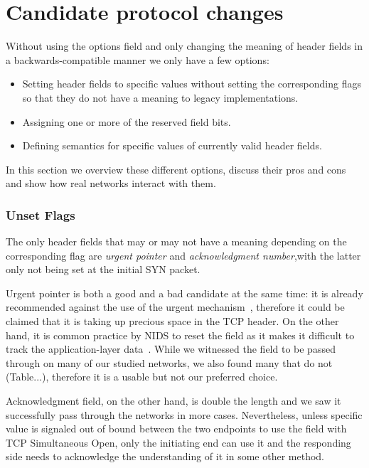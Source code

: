 \documentclass{sig-alternate-10pt}
\begin{document}
\section{Candidate protocol changes}

Without using the options field and only changing the meaning of header fields in a backwards-compatible manner we only have a few options:
\begin{itemize}
    \item Setting header fields to specific values without setting the corresponding flags so that they do not have a meaning to legacy implementations.
    \item Assigning one or more of the reserved field bits.
    \item Defining semantics for specific values of currently valid header fields.
\end{itemize}

In this section we overview these different options, discuss their pros and cons and show how real networks interact with them.

\subsubsection*{Unset Flags}

The only header fields that may or may not have a meaning depending on the corresponding flag are \emph{urgent pointer} and \emph{acknowledgment number},with the latter only not being set at the initial SYN packet.

Urgent pointer is both a good and a bad candidate at the same time: it is already recommended against the use of the urgent mechanism~\cite{Gont:2011vi}, therefore it could be claimed that it is taking up precious space in the TCP header. On the other hand, it is common practice by NIDS to reset the field as it makes it difficult to track the application-layer data~\cite{seolma}. While we witnessed the field to be passed through on many of our studied networks, we also found many that do not (Table...), therefore it is a usable but not our preferred choice.

Acknowledgment field, on the other hand, is double the length and we saw it successfully pass through the networks in more cases. Nevertheless, unless specific value is signaled out of bound between the two endpoints to use the field with TCP Simultaneous Open, only the initiating end can use it and the responding side needs to acknowledge the understanding of it in some other method. 
\end{document}

